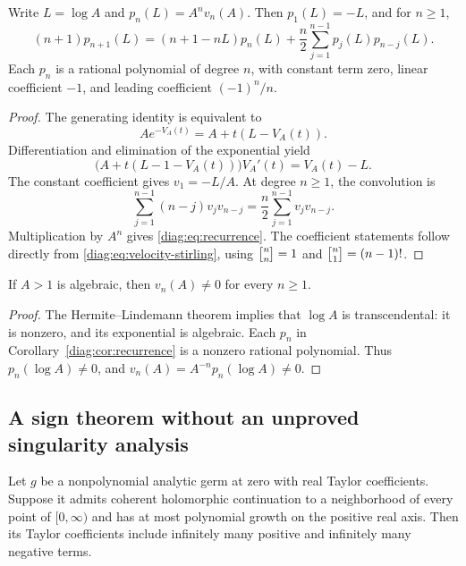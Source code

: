 \begin{corollary}\label{diag:cor:recurrence}
Write $L=\log A$ and $p_n(L)=A^n v_n(A)$.  Then $p_1(L)=-L$, and for
$n\geq1$,
\begin{equation}\label{diag:eq:recurrence}
 (n+1)p_{n+1}(L)
   =(n+1-nL)p_n(L)
       +\frac n2\sum_{j=1}^{n-1}p_j(L)p_{n-j}(L).
\end{equation}
Each $p_n$ is a rational polynomial of degree $n$, with constant term zero,
linear coefficient $-1$, and leading coefficient $(-1)^n/n$.
\end{corollary}

\begin{proof}
The generating identity is equivalent to
\[
 A e^{-V_A(t)}=A+t(L-V_A(t)).
\]
Differentiation and elimination of the exponential yield
\begin{equation}\label{diag:eq:ode}
 \bigl(A+t(L-1-V_A(t))\bigr)V_A'(t)=V_A(t)-L.
\end{equation}
The constant coefficient gives $v_1=-L/A$.  At degree $n\geq1$, the
convolution is
\[
 \sum_{j=1}^{n-1}(n-j)v_jv_{n-j}
       =\frac n2\sum_{j=1}^{n-1}v_jv_{n-j}.
\]
Multiplication by $A^n$ gives \eqref{diag:eq:recurrence}.  The coefficient
statements follow directly from \eqref{diag:eq:velocity-stirling}, using
$\stirling{n}{n}=1$ and
$\stirling{n}{1}=(n-1)!$.
\end{proof}

\begin{corollary}
\label{diag:cor:algebraic-nonvanishing}
If $A>1$ is algebraic, then $v_n(A)\ne0$ for every $n\ge1$.
\end{corollary}
\begin{proof}
The Hermite--Lindemann theorem implies that $\log A$ is transcendental:
it is nonzero, and its exponential is algebraic. Each $p_n$ in
Corollary~\ref{diag:cor:recurrence} is a nonzero rational polynomial.
Thus $p_n(\log A)\ne0$, and $v_n(A)=A^{-n}p_n(\log A)\ne0$.
\end{proof}

\subsection{A sign theorem without an unproved singularity analysis}
\label{diag:subsec:signs}

\begin{lemma}
\label{diag:lem:pringsheim}
Let $g$ be a nonpolynomial analytic germ at zero with real Taylor
coefficients.  Suppose it admits coherent holomorphic continuation to a
neighborhood of every point of $[0,\infty)$ and has at most polynomial
growth on the positive real axis.  Then its Taylor coefficients include
infinitely many positive and infinitely many negative terms.
\end{lemma}


